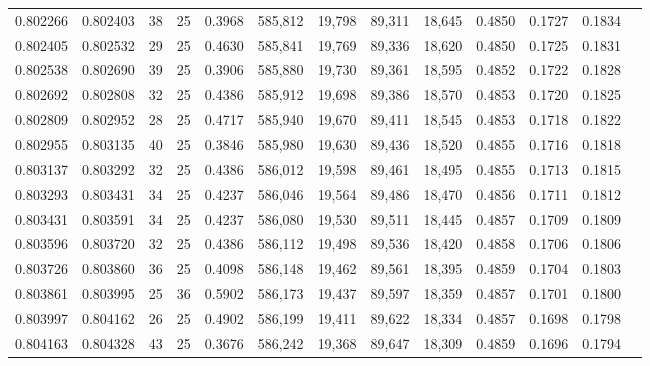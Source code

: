 \begin{tabular}{rrrrrrrrrrrrr}
0.802266 & 0.802403 &    38 &  25 &                                     0.3968 & 585,812 &  19,798 &  89,311 &  18,645 & 0.4850 & 0.1727 & 0.1834 \\
0.802405 & 0.802532 &    29 &  25 &                                     0.4630 & 585,841 &  19,769 &  89,336 &  18,620 & 0.4850 & 0.1725 & 0.1831 \\
0.802538 & 0.802690 &    39 &  25 &                                     0.3906 & 585,880 &  19,730 &  89,361 &  18,595 & 0.4852 & 0.1722 & 0.1828 \\
0.802692 & 0.802808 &    32 &  25 &                                     0.4386 & 585,912 &  19,698 &  89,386 &  18,570 & 0.4853 & 0.1720 & 0.1825 \\
0.802809 & 0.802952 &    28 &  25 &                                     0.4717 & 585,940 &  19,670 &  89,411 &  18,545 & 0.4853 & 0.1718 & 0.1822 \\
0.802955 & 0.803135 &    40 &  25 &                                     0.3846 & 585,980 &  19,630 &  89,436 &  18,520 & 0.4855 & 0.1716 & 0.1818 \\
0.803137 & 0.803292 &    32 &  25 &                                     0.4386 & 586,012 &  19,598 &  89,461 &  18,495 & 0.4855 & 0.1713 & 0.1815 \\
0.803293 & 0.803431 &    34 &  25 &                                     0.4237 & 586,046 &  19,564 &  89,486 &  18,470 & 0.4856 & 0.1711 & 0.1812 \\
0.803431 & 0.803591 &    34 &  25 &                                     0.4237 & 586,080 &  19,530 &  89,511 &  18,445 & 0.4857 & 0.1709 & 0.1809 \\
0.803596 & 0.803720 &    32 &  25 &                                     0.4386 & 586,112 &  19,498 &  89,536 &  18,420 & 0.4858 & 0.1706 & 0.1806 \\
0.803726 & 0.803860 &    36 &  25 &                                     0.4098 & 586,148 &  19,462 &  89,561 &  18,395 & 0.4859 & 0.1704 & 0.1803 \\
0.803861 & 0.803995 &    25 &  36 &                                     0.5902 & 586,173 &  19,437 &  89,597 &  18,359 & 0.4857 & 0.1701 & 0.1800 \\
0.803997 & 0.804162 &    26 &  25 &                                     0.4902 & 586,199 &  19,411 &  89,622 &  18,334 & 0.4857 & 0.1698 & 0.1798 \\
0.804163 & 0.804328 &    43 &  25 &                                     0.3676 & 586,242 &  19,368 &  89,647 &  18,309 & 0.4859 & 0.1696 & 0.1794 \\

\end{tabular}
